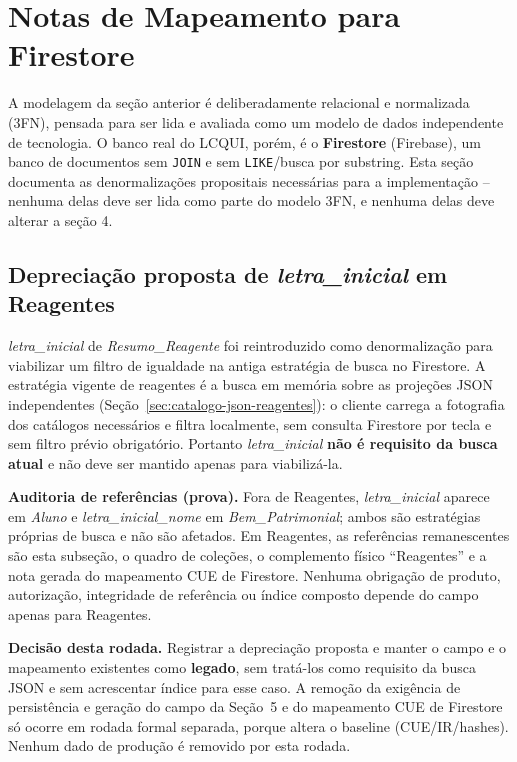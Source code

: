 \section{Notas de Mapeamento para Firestore}

\begin{explicacao}
A modelagem da seção anterior é deliberadamente relacional e normalizada (3FN), pensada para ser lida e avaliada como um modelo de dados independente de tecnologia. O banco real do LCQUI, porém, é o \textbf{Firestore} (Firebase), um banco de documentos sem \texttt{JOIN} e sem \texttt{LIKE}/busca por substring. Esta seção documenta as denormalizações propositais necessárias para a implementação -- nenhuma delas deve ser lida como parte do modelo 3FN, e nenhuma delas deve alterar a seção 4.
\end{explicacao}

\subsection{Depreciação proposta de \textit{letra\_inicial} em Reagentes}
\textit{letra\_inicial} de \textit{Resumo\_Reagente} foi reintroduzido como
denormalização para viabilizar um filtro de igualdade na antiga estratégia de
busca no Firestore. A estratégia vigente de reagentes é a busca em memória sobre
as projeções JSON independentes (Seção~\ref{sec:catalogo-json-reagentes}): o
cliente carrega a fotografia dos catálogos necessários e filtra localmente, sem consulta Firestore por tecla e sem filtro
prévio obrigatório. Portanto \textit{letra\_inicial} \textbf{não é requisito da
busca atual} e não deve ser mantido apenas para viabilizá-la.

\textbf{Auditoria de referências (prova).} Fora de Reagentes,
\textit{letra\_inicial} aparece em \textit{Aluno} e \textit{letra\_inicial\_nome}
em \textit{Bem\_Patrimonial}; ambos são estratégias próprias de busca e não são
afetados. Em Reagentes, as referências remanescentes são esta subseção, o quadro
de coleções, o complemento físico ``Reagentes'' e a nota gerada do mapeamento
CUE de Firestore. Nenhuma obrigação de produto, autorização, integridade de
referência ou índice composto depende do campo apenas para Reagentes.

\textbf{Decisão desta rodada.} Registrar a depreciação proposta e manter o campo
e o mapeamento existentes como \textbf{legado}, sem tratá-los como requisito da
busca JSON e sem acrescentar índice para esse caso. A remoção da exigência de
persistência e geração do campo da Seção~5 e do mapeamento CUE de Firestore só
ocorre em rodada formal separada, porque altera o baseline (CUE/IR/hashes).
Nenhum dado de produção é removido por esta rodada.

